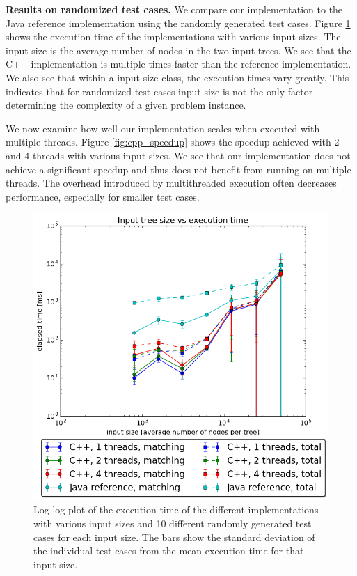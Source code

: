 \documentclass[letterpaper]{article}
\newcommand{\mypar}[1]{{\bf #1.}}
\begin{document}
\mypar{Results on randomized test cases}
We compare our implementation to the Java reference implementation using the randomly generated test cases.
Figure \ref{fig:cpp_vs_java} shows the execution time of the implementations with various input sizes.
The input size is the average number of nodes in the two input trees.
We see that the C++ implementation is multiple times faster than the reference implementation.
We also see that within a input size class, the execution times vary greatly.
This indicates that for randomized test cases input size is not the only factor determining the complexity of a given problem instance.

We now examine how well our implementation scales when executed with multiple threads.
Figure \ref{fig:cpp_speedup} shows the speedup achieved with 2 and 4 threads with various input sizes.
We see that our implementation does not achieve a significant speedup and thus does not benefit from running on multiple threads.
The overhead introduced by multithreaded execution often decreases performance, especially for smaller test cases.

\begin{figure}
	\includegraphics[width=\linewidth]{measurements/random/timePlot}
	\caption{Log-log plot of the execution time of the different implementations with various input sizes and 10 different randomly generated test cases for each input size. The bars show the standard deviation of the individual test cases from the mean execution time for that input size.}
	\label{fig:cpp_vs_java}
\end{figure}
\end{document}
